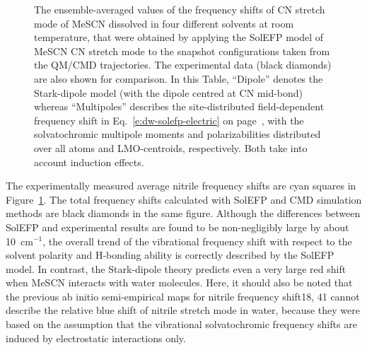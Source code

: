 \documentclass[b5paper,oneside,fleqn,11pt]{book}
\begin{document}
\begin{refsection}
%
\begin{figure}[t!]
\centering
\setlength\fboxsep{0.4pt}
\setlength\fboxrule{0.5pt}
\caption{
The ensemble\hyp{}averaged values of the frequency shifts of CN stretch mode of MeSCN dissolved in four
different solvents at room temperature, that were obtained by applying the SolEFP model of MeSCN CN
stretch mode to the snapshot configurations taken from the QM/CMD trajectories. The experimental data (black
diamonds) are also shown for comparison. In this Table, ``Dipole'' denotes the Stark\hyp{}dipole model (with the
dipole centred at CN mid\hyp{}bond) whereas ``Multipoles'' describes the site\hyp{}distributed field\hyp{}dependent
frequency shift in Eq.~\ref{e:dw-solefp-electric} on page~\pageref{e:dw-solefp-electric}, 
with the solvatochromic multipole moments and polarizabilities distributed over
all atoms and LMO\hyp{}centroids, respectively. Both take into account induction effects.
\label{t:mescn-solefp-md-exp}}
\end{figure}
%
The experimentally measured average nitrile frequency
shifts are cyan squares in Figure~\ref{t:mescn-solefp-md-exp}. 
The total frequency shifts
calculated with SolEFP and CMD simulation methods are black
diamonds in the same figure. Although the differences
between SolEFP and experimental results are found to be non-negligibly
large by about 10~cm$^{-1}$, the overall trend of the
vibrational frequency shift with respect to the solvent polarity
and H-bonding ability is correctly described by the SolEFP
model. In contrast, the Stark\hyp{}dipole theory predicts even a
very large red shift when MeSCN interacts with water
molecules. Here, it should also be noted that the previous ab
initio semi\hyp{}empirical maps for nitrile frequency shift18, 41
cannot describe the relative blue shift of nitrile stretch mode
in water, because they were based on the assumption that the
vibrational solvatochromic frequency shifts are induced by
electrostatic interactions only.


\end{refsection}
\end{document}
